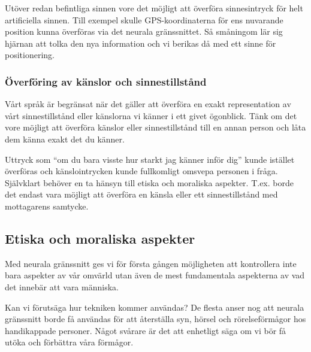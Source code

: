 \documentclass[12pt, a4paper]{article}
\begin{document}
Utöver redan befintliga sinnen vore det möjligt att överföra sinnesintryck för helt artificiella sinnen. Till exempel skulle GPS-koordinaterna för ens nuvarande position kunna överföras via det neurala gränssnittet. Så småningom lär sig hjärnan att tolka den nya information och vi berikas då med ett sinne för positionering.


\subsubsection{Överföring av känslor och sinnestillstånd}

Vårt språk är begränsat när det gäller att överföra en exakt representation av vårt sinnestillstånd eller känslorna vi känner i ett givet ögonblick. Tänk om det vore möjligt att överföra känslor eller sinnestillstånd till en annan person och låta dem känna exakt det du känner.

Uttryck som ``om du bara visste hur starkt jag känner inför dig'' kunde istället överföras och känslointrycken kunde fullkomligt omsvepa personen i fråga. Självklart behöver en ta hänsyn till etiska och moraliska aspekter. T.ex. borde det endast vara möjligt att överföra en känsla eller ett sinnestillstånd med mottagarens samtycke.


\subsection{Etiska och moraliska aspekter}


Med neurala gränssnitt ges vi för första gången möjligheten att kontrollera inte bara aspekter av vår omvärld utan även de mest fundamentala aspekterna av vad det innebär att vara människa.

Kan vi förutsäga hur tekniken kommer användas? De flesta anser nog att neurala gränssnitt borde få användas för att återställa syn, hörsel och rörelseförmågor hos handikappade personer. Något svårare är det att enhetligt säga om vi bör få utöka och förbättra våra förmågor.
\end{document}
